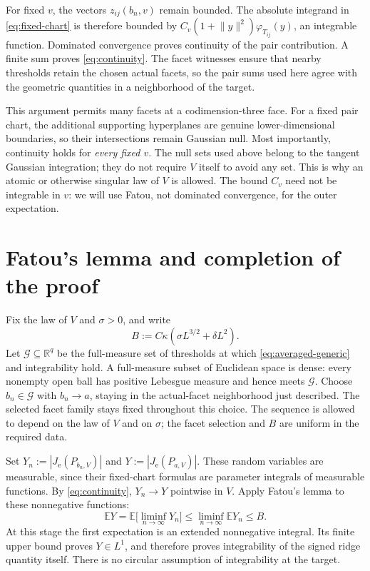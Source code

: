 \documentclass[11pt]{article}
\newcommand{\R}{\mathbb R}
\newcommand{\E}{\mathbb E}
\newcommand{\norm}[1]{\lVert #1\rVert}
\newcommand{\Je}{J_{\mathrm e}}
\begin{document}
For fixed $v$, the vectors $z_{ij}(b_n,v)$ remain bounded. The absolute
integrand in \eqref{eq:fixed-chart} is therefore bounded by
$C_v(1+\norm y^2)\varphi_{T_{ij}}(y)$, an integrable function. Dominated
convergence proves continuity of the pair contribution. A finite sum
proves \eqref{eq:continuity}. The facet witnesses ensure that nearby
thresholds retain the chosen actual facets, so the pair sums used here
agree with the geometric quantities in a neighborhood of the target.

This argument permits many facets at a codimension-three face. For a
fixed pair chart, the additional supporting hyperplanes are genuine
lower-dimensional boundaries, so their intersections remain Gaussian
null. Most importantly, continuity holds for \emph{every fixed $v$}.
The null sets used above belong to the tangent Gaussian integration;
they do not require $V$ itself to avoid any set. This is why an atomic
or otherwise singular law of $V$ is allowed. The bound $C_v$ need not
be integrable in $v$: we will use Fatou, not dominated convergence,
for the outer expectation.

\section{Fatou's lemma and completion of the proof}

Fix the law of $V$ and $\sigma>0$, and write
\[
 B:=C\kappa(\sigma L^{3/2}+\delta L^2).
\]
Let $\mathcal G\subseteq\R^q$ be the full-measure set of thresholds
at which \eqref{eq:averaged-generic} and integrability hold. A
full-measure subset of Euclidean space is dense: every nonempty open
ball has positive Lebesgue measure and hence meets $\mathcal G$.
Choose $b_n\in\mathcal G$ with $b_n\to a$, staying in the actual-facet
neighborhood just described. The selected facet family stays fixed
throughout this choice. The sequence is allowed to depend on the
law of $V$ and on $\sigma$; the facet selection and $B$ are uniform in
the required data.

Set $Y_n:=|\Je(P_{b_n,V})|$ and $Y:=|\Je(P_{a,V})|$. These random
variables are measurable, since their fixed-chart formulas are
parameter integrals of measurable functions. By
\eqref{eq:continuity}, $Y_n\to Y$ pointwise in $V$. Apply Fatou's
lemma to these nonnegative functions:
\begin{equation}\label{eq:fatou}
 \E Y
 =\E\bigl[\liminf_{n\to\infty}Y_n\bigr]
 \le\liminf_{n\to\infty}\E Y_n
 \le B.
\end{equation}
At this stage the first expectation is an extended nonnegative
integral. Its finite upper bound proves $Y\in L^1$, and therefore
proves integrability of the signed ridge quantity itself. There is
no circular assumption of integrability at the target.
\end{document}

